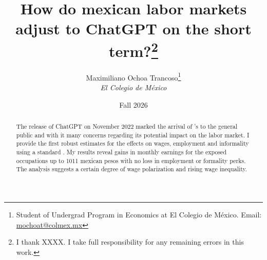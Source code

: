 \documentclass[12pt, twoside]{article}
\title{How do mexican labor markets adjust to ChatGPT on the short term?\thanks{I thank XXXX. I take full responsibility for any remaining errors in this work.}}
\author{Maximiliano Ochoa Trancoso\thanks{Student of Undergrad Program in Economics at El Colegio de México. Email: \href{mailto:mochoat@colmex.mx}{mochoat@colmex.mx}} \\ [-1pt]{\normalsize \textit{El Colegio de México}} \\}
\date{Fall 2026}
\begin{document}
\begin{singlespace}
    \maketitle
    \begin{abstract}
        \noindent The release of ChatGPT on November 2022 marked the arrival of 's to the general public and with it many concerns regarding its potential impact on the labor market. I provide the first robust estimates for the effects on wages, employment and informality using a standard . My results reveal gains in monthly earnings for the exposed occupations up to 1011 mexican pesos with no loss in employment or formality perks. The analysis suggests a certain degree of wage polarization and rising wage inequality.
    \end{abstract}

\end{singlespace}
\newpage
\tableofcontents

\newpage






\appendix
\newpage

\newpage

\newpage


\newpage
\listoffigures
\newpage
\end{document}
